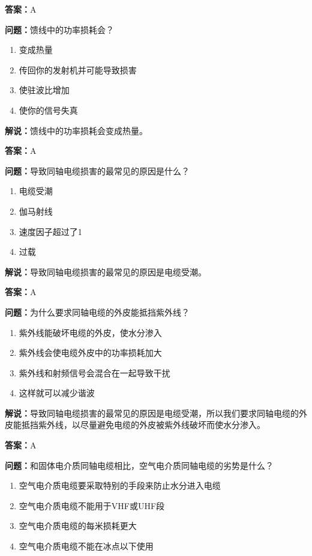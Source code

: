 \documentclass[UTF8]{ctexbook}
\begin{document}
\textbf{答案：}A

\textbf{问题：}馈线中的功率损耗会？

\begin{enumerate}[label=\Alph*), leftmargin=3em]
  \item 变成热量
  \item 传回你的发射机并可能导致损害
  \item 使驻波比增加
  \item 使你的信号失真
\end{enumerate}

\textbf{解说：}馈线中的功率损耗会变成热量。%

\textbf{答案：}A

\textbf{问题：}导致同轴电缆损害的最常见的原因是什么？

\begin{enumerate}[label=\Alph*), leftmargin=3em]
  \item 电缆受潮
  \item 伽马射线
  \item 速度因子超过了1
  \item 过载
\end{enumerate}

\textbf{解说：}导致同轴电缆损害的最常见的原因是电缆受潮。%

\textbf{答案：}A

\textbf{问题：}为什么要求同轴电缆的外皮能抵挡紫外线？

\begin{enumerate}[label=\Alph*), leftmargin=3em]
  \item 紫外线能破坏电缆的外皮，使水分渗入
  \item 紫外线会使电缆外皮中的功率损耗加大
  \item 紫外线和射频信号会混合在一起导致干扰
  \item 这样就可以减少谐波
\end{enumerate}

\textbf{解说：}导致同轴电缆损害的最常见的原因是电缆受潮，所以我们要求同轴电缆的外皮能抵挡紫外线，以尽量避免电缆的外皮被紫外线破坏而使水分渗入。%

\textbf{答案：}A

\textbf{问题：}和固体电介质同轴电缆相比，空气电介质同轴电缆的劣势是什么？

\begin{enumerate}[label=\Alph*), leftmargin=3em]
  \item 空气电介质电缆要采取特别的手段来防止水分进入电缆
  \item 空气电介质电缆不能用于VHF或UHF段
  \item 空气电介质电缆的每米损耗更大
  \item 空气电介质电缆不能在冰点以下使用
\end{enumerate}
\end{document}
